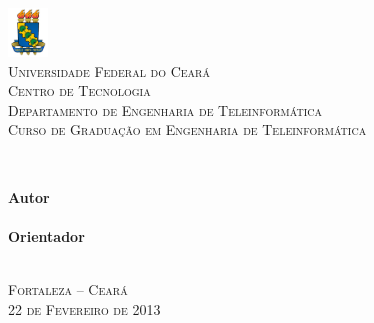 \thispagestyle{empty}%

\begin{center}
    \includegraphics[width=0.08\textwidth]{figs/ufc.jpg} \\%
    \textsc{
    Universidade Federal do Cear{\'a} \\%
    Centro de Tecnologia \\%
    Departamento de Engenharia de Teleinform{\'a}tica \\%
    Curso de Gradua\c{c}\~{a}o em Engenharia de Teleinform{\'a}tica \\%
    }
    
	\null\vfill%
    \vspace{.5cm}%
    {\LARGE         \textbf{\titulo}\\}

    \null\vfill%
    \vspace{.5cm}%
	{\normalsize    \textbf{Autor} \\%
                         \autor} \\%

    \null\vfill%
    \vspace{.25cm}%
    {\normalsize    \textbf{Orientador} \\%
                    \upshape{\orientador}} \\%

    \null\vfill%
    \vspace{.25cm}%
    
	{\normalsize    \textsc{Fortaleza -- Cear{\'a} \\%
                            22 de Fevereiro de 2013}}
\end{center}
